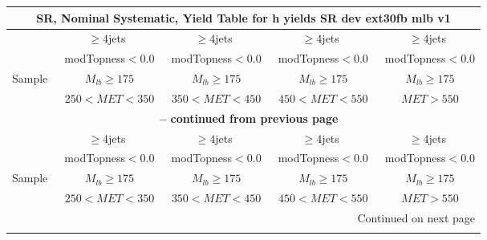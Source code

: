 \documentclass{article}
\begin{document}
 
 
\begin{longtable}{|l|c|c|c|c|} 
 
\multicolumn{5}{c}{ SR, Nominal Systematic, Yield Table for h yields SR dev ext30fb mlb v1 }\\* \hline 
  & $\ge4$jets  & $\ge4$jets  & $\ge4$jets  & $\ge4$jets \\* 
  & ~modTopness$<0.0$  & ~modTopness$<0.0$  & ~modTopness$<0.0$  & ~modTopness$<0.0$ \\* 
Sample  & ~$M_{lb}\ge175$  & ~$M_{lb}\ge175$  & ~$M_{lb}\ge175$  & ~$M_{lb}\ge175$ \\* 
  & ~$250<MET<350$  & ~$350<MET<450$  & ~$450<MET<550$  & ~$MET>550$ \\* 
\hline \hline 
\endfirsthead 
 
\multicolumn{5}{c}{{\bfseries \tablename\ \thetable{} -- continued from previous page}}\\* \hline 
  & $\ge4$jets  & $\ge4$jets  & $\ge4$jets  & $\ge4$jets \\* 
  & ~modTopness$<0.0$  & ~modTopness$<0.0$  & ~modTopness$<0.0$  & ~modTopness$<0.0$ \\* 
Sample  & ~$M_{lb}\ge175$  & ~$M_{lb}\ge175$  & ~$M_{lb}\ge175$  & ~$M_{lb}\ge175$ \\* 
  & ~$250<MET<350$  & ~$350<MET<450$  & ~$450<MET<550$  & ~$MET>550$ \\* 
\hline \hline 
\endhead 
 
\multicolumn{5}{|r|}{{Continued on next page}}\\* \hline 
\endfoot 
 
 
\endlastfoot 
 

\end{longtable}
\end{document}
